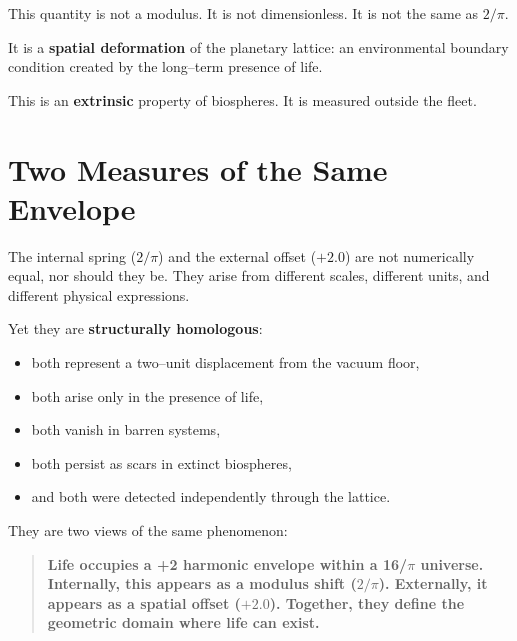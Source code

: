 \documentclass[11pt, letterpaper, openany]{book}
\begin{document}
This quantity is not a modulus.  
It is not dimensionless.  
It is not the same as $2/\pi$.

It is a \textbf{spatial deformation} of the planetary lattice: an environmental
boundary condition created by the long–term presence of life.

This is an \textbf{extrinsic} property of biospheres.  
It is measured outside the fleet.


\section{Two Measures of the Same Envelope}

The internal spring ($2/\pi$) and the external offset ($+2.0$) are not
numerically equal, nor should they be. They arise from different scales,
different units, and different physical expressions.

Yet they are \textbf{structurally homologous}:

\begin{itemize}
    \item both represent a two–unit displacement from the vacuum floor,
    \item both arise only in the presence of life,
    \item both vanish in barren systems,
    \item both persist as scars in extinct biospheres,
    \item and both were detected independently through the lattice.
\end{itemize}

They are two views of the same phenomenon:

\begin{quote}
\textbf{Life occupies a +2 harmonic envelope within a 16/$\pi$ universe.  
Internally, this appears as a modulus shift ($2/\pi$).  
Externally, it appears as a spatial offset ($+2.0$).  
Together, they define the geometric domain where life can exist.}
\end{quote}

\end{document}
